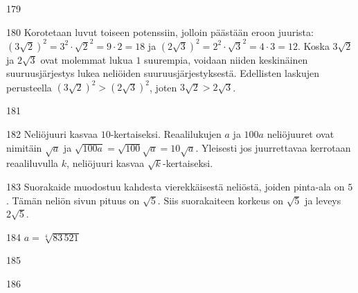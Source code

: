\begin{Vastaus}{179}
	
\end{Vastaus}
\begin{Vastaus}{180}
Korotetaan luvut toiseen potenssiin, jolloin päästään eroon juurista: $(3\sqrt{2})^2=3^2\cdot\sqrt{2}^2=9 \cdot 2=18$ ja $(2\sqrt{3})^2=2^2\cdot\sqrt{3}^2=4 \cdot 3=12$. Koska $3\sqrt{2}$ ja $2\sqrt{3}$ ovat molemmat lukua $1$ suurempia, voidaan niiden keskinäinen suuruusjärjestys lukea neliöiden suuruusjärjestyksestä. Edellisten laskujen perusteella $(3\sqrt{2})^2 > (2\sqrt{3})^2$, joten $3\sqrt{2} > 2\sqrt{3}$.
        
\end{Vastaus}
\begin{Vastaus}{181}
\end{Vastaus}
\begin{Vastaus}{182}
Neliöjuuri kasvaa $10$-kertaiseksi. Reaalilukujen $a$ ja $100a$ neliöjuuret ovat nimitäin $\sqrt{a}$ ja $\sqrt{100a}=\sqrt{100}\sqrt{a}=10\sqrt{a}$. Yleisesti jos juurrettavaa kerrotaan reaaliluvulla $k$, neliöjuuri kasvaa $\sqrt{k}$-kertaiseksi.
        
\end{Vastaus}
\begin{Vastaus}{183}
Suorakaide muodostuu kahdesta vierekkäisestä neliöstä, joiden pinta-ala on $5$. Tämän neliön sivun pituus on $\sqrt{5}$. Siis suorakaiteen korkeus on $\sqrt{5}$ ja leveys $2\sqrt{5}$.
\end{Vastaus}
\begin{Vastaus}{184}
$a=\sqrt[4]{83\,521}$
	
\end{Vastaus}
\begin{Vastaus}{185}
	
\end{Vastaus}
\begin{Vastaus}{186}
	
\end{Vastaus}
